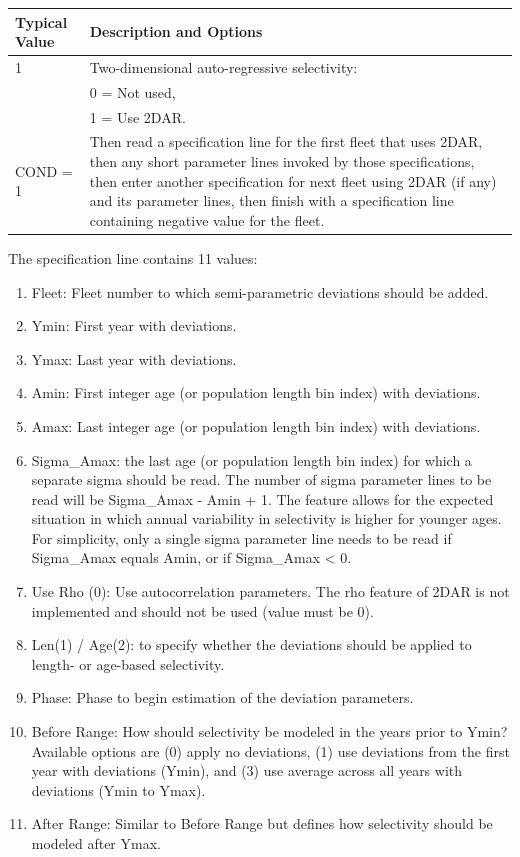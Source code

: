 \begin{tabular}{p{2cm} p{14cm}}
	\hline
	Typical Value & Description and Options \Tstrut\Bstrut\\
	\hline
	1 \Tstrut & Two-dimensional auto-regressive selectivity: \\
	  & 0 = Not used, \\
	  & 1 = Use 2DAR. \\
	COND = 1 & Then read a specification line for the first fleet that uses 2DAR, then any short parameter lines invoked by those specifications, then enter another specification for next fleet using 2DAR (if any) and its parameter lines, then finish with a specification line containing negative value for the fleet. \Bstrut\\
	\hline
\end{tabular}

The specification line contains 11 values:
\begin{enumerate}
	\item Fleet: Fleet number to which semi-parametric deviations should be added.
	\item Ymin: First year with deviations.
	\item Ymax: Last year with deviations.
	\item Amin: First integer age (or population length bin index) with deviations.
	\item Amax: Last integer age (or population length bin index) with deviations.
	\item Sigma\_Amax: the last age (or population length bin index) for which a separate sigma should be read. The number of sigma parameter lines to be read will be Sigma\_Amax - Amin + 1. The feature allows for the expected situation in which annual variability in selectivity is higher for younger ages. For simplicity, only a single sigma parameter line needs to be read if Sigma\_Amax equals Amin, or if Sigma\_Amax < 0.
	\item Use Rho (0): Use autocorrelation parameters. The rho feature of 2DAR is not implemented and should not be used (value must be 0).
	\item Len(1) / Age(2): to specify whether the deviations should be applied to length- or age-based selectivity.
	\item Phase: Phase to begin estimation of the deviation parameters.
	\item Before Range: How should selectivity be modeled in the years prior to Ymin? Available options are (0) apply no deviations, (1) use deviations from the first year with deviations (Ymin), and (3) use average across all years with deviations (Ymin to Ymax).
	\item After Range: Similar to Before Range but defines how selectivity should be modeled after Ymax.
\end{enumerate}

